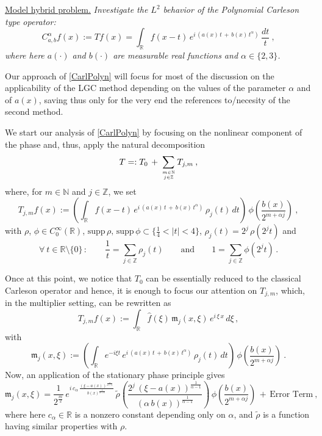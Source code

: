 \documentclass[a4paper,reqno]{amsart}
\numberwithin{equation}{section}
\theoremstyle{definition}
\newcommand{\R}{\mathbb{R}}
\newcommand{\Z}{\mathbb{Z}}
\newcommand{\N}{\mathbb{N}}
\def\a{\alpha}
\begin{document}
\noindent \underline{\textsf{Model hybrid problem.}} \emph{Investigate the $L^2$ behavior of the Polynomial Carleson type operator:
\begin{equation}\label{CarlPolyn}
	C_{a,b}^{\a} f(x):=Tf(x)=\int_{\R} f(x-t)\,e^{i\,(a(x)\,t\,+\,b(x)\,t^{\a})}\,\frac{dt}{t}\:,
\end{equation}
where here $a(\cdot)$ and $b(\cdot)$ are measurable real functions and $\a\in\{2,3\}$.}
\medskip

Our approach of \eqref{CarlPolyn} will focus for most of the discussion on the applicability of the LGC method depending on the values of the parameter $\a$  and of $a(x)$, saving thus only for the very end the references to/necesity of the second method.

We start our analysis of \eqref{CarlPolyn} by focusing on the nonlinear component of the phase and, thus,  apply the natural decomposition
\begin{equation}\label{DecT}
	T=:T_0\,+\,\sum_{{m\in\N}\atop{j\in\Z}}T_{j,m}\:,
\end{equation}
where, for $m\in\N$ and $j\in\Z$, we set
\begin{equation}\label{CarlPolyn1}
	T_{j,m} f(x):=\left(\int_{\R} f(x-t)\,e^{i\,(a(x)\,t\,+\,b(x)\,t^{\a})}\,\rho_j(t)\,dt\right)\,\phi\left(\frac{b(x)}{2^{m+\a j}}\right)\:,
\end{equation}
with $\rho$, $\phi\in C_0^{\infty}(\R)$, $\textrm{supp}\,\rho,\,\textrm{supp}\,\phi\subset\{\frac{1}{4}<|t|<4\}$,
$\rho_j(t)=2^j\,\rho(2^j t)$ and
$$\forall\:t\in \R\setminus\{0\}\,:\qquad\frac{1}{t}=\sum_{j\in\Z} \rho_j(t)\qquad\textrm{and}\qquad 1=\sum_{j\in\Z} \phi(2^j t)\,.$$

Once at this point, we notice that $T_0$ can be essentially reduced to the classical Carleson operator and hence, it is enough to focus our attention on $T_{j,m}$, which, in the multiplier setting, can be rewritten as
$$T_{j,m} f(x):=\int_{\R} \hat{f}(\xi)\,\mathfrak{m}_j(x,\xi)\,e^{i\,\xi\,x}\,d\xi\,,$$
with
\begin{equation}\label{multipl}
	\mathfrak{m}_j(x,\xi):=\left(\int_{\R} e^{-i \xi t}\,e^{i\,(a(x)\,t\,+\,b(x)\,t^{\a})}\,\rho_j(t)\,dt\right)\,\phi\left(\frac{b(x)}{2^{m+\a j}}\right)\:.
\end{equation}
Now, an application of the stationary phase principle gives
\begin{equation}\label{multipl1}
	\mathfrak{m}_j(x,\xi)=\frac{1}{2^{\frac{m}{2}}}\,e^{i\,c_{\a}\, \frac{(\xi-a(x))^{\frac{\a}{\a-1}}}{b(x)^{\frac{1}{\a-1}}}} \,\tilde{\rho}\left(\frac{2^j\,(\xi-a(x))^{\frac{1}{\a-1}}}{(\a\,b(x))^{\frac{1}{\a-1}}}\right)\,\phi\left(\frac{b(x)}{2^{m+\a j}}\right)\,+\,\textrm{Error Term}\:,
\end{equation}
where here $c_{\a}\in\R$ is a nonzero constant depending only on $\a$, and $\tilde{\rho}$ is a function having similar properties with $\rho$.
\end{document}
